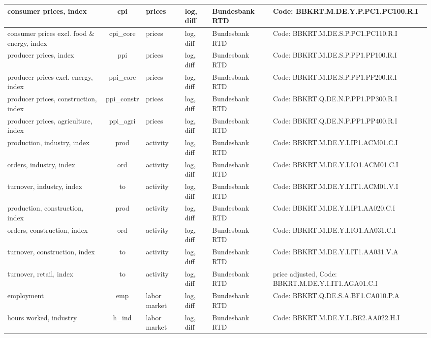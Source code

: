 \documentclass[notitlepage,a4paper,12pt]{article}
\begin{document}
\begin{ThreePartTable}
\begin{landscape}
\begin{longtable}{| l | c | l | l | l | l |}
    consumer prices, index\tnote{s,c} & cpi & prices & log, diff  & Bundesbank RTD & Code: BBKRT.M.DE.Y.P.PC1.PC100.R.I \\ \hline
    consumer prices excl. food \& energy, index\tnote{s,c} & cpi\_core & prices & log, diff  & Bundesbank RTD & Code: BBKRT.M.DE.S.P.PC1.PC110.R.I \\ \hline
    producer prices, index\tnote{s} & ppi & prices & log, diff  & Bundesbank RTD & Code: BBKRT.M.DE.S.P.PP1.PP100.R.I \\ \hline
    producer prices excl. energy, index\tnote{s} & ppi\_core & prices & log, diff  & Bundesbank RTD & Code: BBKRT.M.DE.S.P.PP1.PP200.R.I \\ \hline    
    producer prices, construction, index & ppi\_constr & prices & log, diff  & Bundesbank RTD & Code: BBKRT.Q.DE.N.P.PP1.PP300.R.I \\ \hline
    producer prices, agriculture, index\tnote{s} & ppi\_agri & prices & log, diff  & Bundesbank RTD & Code: BBKRT.Q.DE.N.P.PP1.PP400.R.I \\ \hline 
    production, industry, index\tnote{s,c} & prod & activity & log, diff  & Bundesbank RTD & Code: BBKRT.M.DE.Y.I.IP1.ACM01.C.I \\ \hline
    orders, industry, index\tnote{s,c} & ord & activity & log, diff  & Bundesbank RTD & Code: BBKRT.M.DE.Y.I.IO1.ACM01.C.I \\ \hline
    turnover, industry, index\tnote{s,c} & to & activity & log, diff  & Bundesbank RTD & Code: BBKRT.M.DE.Y.I.IT1.ACM01.V.I \\ \hline
    production, construction, index\tnote{s,c} & prod & activity & log, diff  & Bundesbank RTD & Code: BBKRT.M.DE.Y.I.IP1.AA020.C.I \\ \hline
    orders, construction, index\tnote{s,c} & ord & activity & log, diff  & Bundesbank RTD & Code: BBKRT.M.DE.Y.I.IO1.AA031.C.I \\ \hline
    turnover, construction, index\tnote{s,c} & to & activity & log, diff  & Bundesbank RTD & Code: BBKRT.M.DE.Y.I.IT1.AA031.V.A \\ \hline
    turnover, retail, index\tnote{s,c} & to & activity & log, diff  & Bundesbank RTD & price adjusted, Code: BBKRT.M.DE.Y.I.IT1.AGA01.C.I \\ \hline
    employment \tnote{s, c} & emp & labor market & log, diff & Bundesbank RTD & Code: BBKRT.Q.DE.S.A.BF1.CA010.P.A \\ \hline
    hours worked, industry\tnote{s,c} & h\_ind & labor market & log, diff & Bundesbank RTD & Code: BBKRT.M.DE.Y.L.BE2.AA022.H.I \\ \hline

\end{longtable}
\end{landscape}
\end{ThreePartTable}
\end{document}
